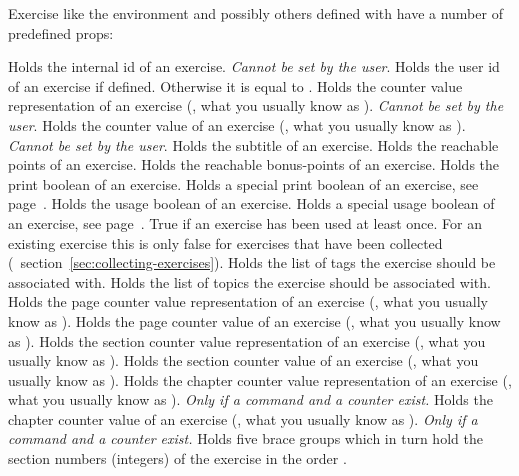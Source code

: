 \documentclass{xsim-manual}
\begin{document}
Exercise like the  environment and possibly others defined with
 have a number of predefined \acsp*{prop}:
\begin{properties}
    Holds the internal id of an exercise.  \emph{Cannot be set by the user}.
    Holds the user id of an exercise if defined.  Otherwise it is equal to
    .
    Holds the counter value representation of an exercise (\ie, what you
    usually know as ).  \emph{Cannot be set by the
      user}.
    Holds the counter value of an exercise (\ie, what you usually know as
    ).  \emph{Cannot be set by the user}.
    Holds the subtitle of an exercise.
    Holds the reachable points of an exercise.
    Holds the reachable bonus-points of an exercise.
    Holds the print boolean of an exercise.
    Holds a special print boolean of an exercise, see
    page~\pageref{property:print!}.
    Holds the usage boolean of an exercise.
    Holds a special usage boolean of an exercise, see
    page~\pageref{property:print!}.
    True if an exercise has been used at least once.  For an existing exercise
    this is only false for exercises that have been collected
    (\cf~section~\vref{sec:collecting-exercises}).
    Holds the list of tags the exercise should be associated with.
    Holds the list of topics the exercise should be associated with.
    Holds the page counter value representation of an exercise (\ie, what you
    usually know as ).
    Holds the page counter value of an exercise (\ie, what you usually know as
    ).
    Holds the section counter value representation of an exercise (\ie, what
    you usually know as ).
    Holds the section counter value of an exercise (\ie, what you usually know
    as ).
    Holds the chapter counter value representation of an exercise (\ie, what
    you usually know as ).  \emph{Only if a command
       \emph{and} a counter  exist.}
    Holds the chapter counter value of an exercise (\ie, what you usually know
    as ).  \emph{Only if a command 
      \emph{and} a counter  exist.}
    Holds five brace groups which in turn hold the section numbers (integers)
    of the exercise in the order
    .
\end{properties}
\end{document}
